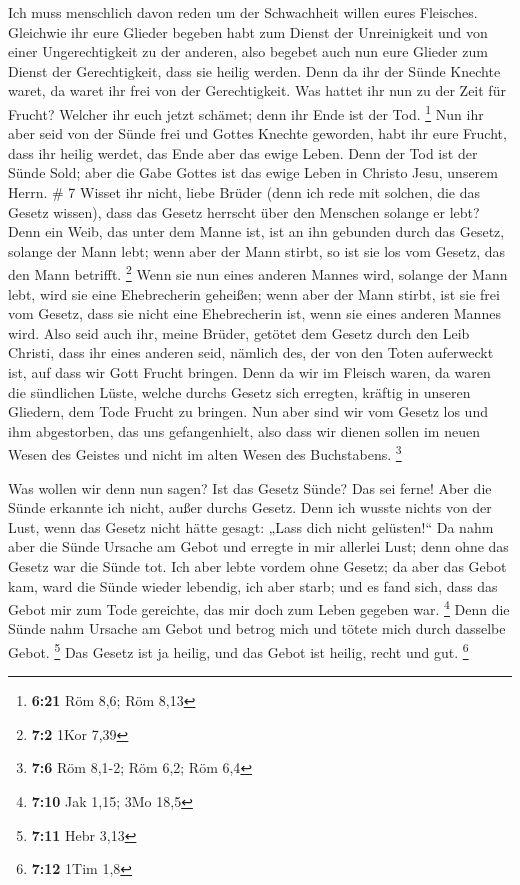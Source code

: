  Ich muss menschlich davon reden um der Schwachheit willen
eures Fleisches. Gleichwie ihr eure Glieder begeben habt zum Dienst der
Unreinigkeit und von einer Ungerechtigkeit zu der anderen, also begebet
auch nun eure Glieder zum Dienst der Gerechtigkeit, dass sie heilig
werden.  Denn da ihr der Sünde Knechte waret, da waret ihr
frei von der Gerechtigkeit.  Was hattet ihr nun zu der Zeit
für Frucht? Welcher ihr euch jetzt schämet; denn ihr Ende ist der Tod.
\footnote{\textbf{6:21} Röm 8,6; Röm 8,13}  Nun ihr aber
seid von der Sünde frei und Gottes Knechte geworden, habt ihr eure
Frucht, dass ihr heilig werdet, das Ende aber das ewige Leben.
 Denn der Tod ist der Sünde Sold; aber die Gabe Gottes ist
das ewige Leben in Christo Jesu, unserem Herrn. \# 7  Wisset
ihr nicht, liebe Brüder (denn ich rede mit solchen, die das Gesetz
wissen), dass das Gesetz herrscht über den Menschen solange er lebt?
 Denn ein Weib, das unter dem Manne ist, ist an ihn gebunden
durch das Gesetz, solange der Mann lebt; wenn aber der Mann stirbt, so
ist sie los vom Gesetz, das den Mann betrifft. \footnote{\textbf{7:2}
  1Kor 7,39}  Wenn sie nun eines anderen Mannes wird,
solange der Mann lebt, wird sie eine Ehebrecherin geheißen; wenn aber
der Mann stirbt, ist sie frei vom Gesetz, dass sie nicht eine
Ehebrecherin ist, wenn sie eines anderen Mannes wird.  Also
seid auch ihr, meine Brüder, getötet dem Gesetz durch den Leib Christi,
dass ihr eines anderen seid, nämlich des, der von den Toten auferweckt
ist, auf dass wir Gott Frucht bringen.  Denn da wir im
Fleisch waren, da waren die sündlichen Lüste, welche durchs Gesetz sich
erregten, kräftig in unseren Gliedern, dem Tode Frucht zu bringen.
 Nun aber sind wir vom Gesetz los und ihm abgestorben, das
uns gefangenhielt, also dass wir dienen sollen im neuen Wesen des
Geistes und nicht im alten Wesen des Buchstabens. \footnote{\textbf{7:6}
  Röm 8,1-2; Röm 6,2; Röm 6,4}

 Was wollen wir denn nun sagen? Ist das Gesetz Sünde? Das
sei ferne! Aber die Sünde erkannte ich nicht, außer durchs Gesetz. Denn
ich wusste nichts von der Lust, wenn das Gesetz nicht hätte gesagt:
„Lass dich nicht gelüsten!{}``  Da nahm aber die Sünde
Ursache am Gebot und erregte in mir allerlei Lust; denn ohne das Gesetz
war die Sünde tot.  Ich aber lebte vordem ohne Gesetz; da
aber das Gebot kam, ward die Sünde wieder lebendig,  ich
aber starb; und es fand sich, dass das Gebot mir zum Tode gereichte, das
mir doch zum Leben gegeben war. \footnote{\textbf{7:10} Jak 1,15; 3Mo
  18,5}  Denn die Sünde nahm Ursache am Gebot und betrog
mich und tötete mich durch dasselbe Gebot. \footnote{\textbf{7:11} Hebr
  3,13}  Das Gesetz ist ja heilig, und das Gebot ist
heilig, recht und gut. \footnote{\textbf{7:12} 1Tim 1,8}

